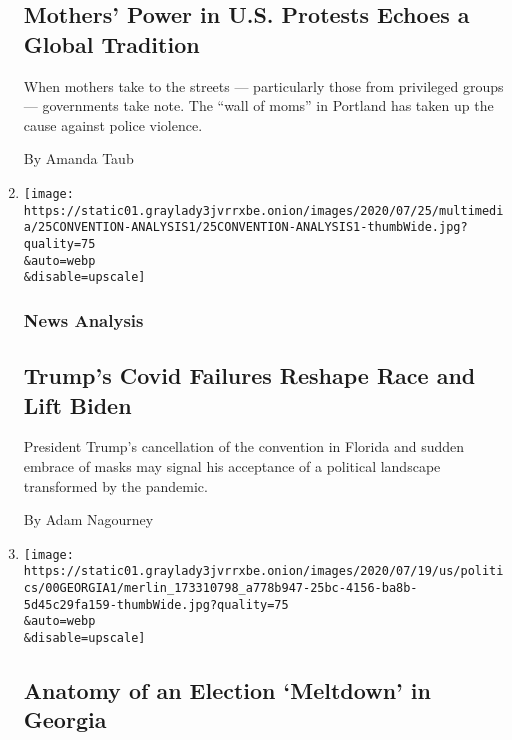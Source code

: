 \begin{enumerate}
  \hypertarget{mothers-power-in-us-protests-echoes-a-global-tradition}{%
  \subsection{Mothers' Power in U.S. Protests Echoes a Global
  Tradition}\label{mothers-power-in-us-protests-echoes-a-global-tradition}}

  When mothers take to the streets --- particularly those from
  privileged groups --- governments take note. The ``wall of moms'' in
  Portland has taken up the cause against police violence.

  By Amanda Taub
\item
  \href{/2020/07/25/us/politics/trump-florida-convention.html}{}

  \texttt{[image: https://static01.graylady3jvrrxbe.onion/images/2020/07/25/multimedia/25CONVENTION-ANALYSIS1/25CONVENTION-ANALYSIS1-thumbWide.jpg?quality=75\\\&auto=webp\\\&disable=upscale]}

  \hypertarget{news-analysis-1}{%
  \subsubsection{News Analysis}\label{news-analysis-1}}

  \hypertarget{trumps-covid-failures-reshape-race-and-lift-biden-1}{%
  \subsection{Trump's Covid Failures Reshape Race and Lift
  Biden}\label{trumps-covid-failures-reshape-race-and-lift-biden-1}}

  President Trump's cancellation of the convention in Florida and sudden
  embrace of masks may signal his acceptance of a political landscape
  transformed by the pandemic.

  By Adam Nagourney
\item
  \href{/2020/07/25/us/politics/georgia-election-voting-problems.html}{}

  \texttt{[image: https://static01.graylady3jvrrxbe.onion/images/2020/07/19/us/politics/00GEORGIA1/merlin\_173310798\_a778b947-25bc-4156-ba8b-5d45c29fa159-thumbWide.jpg?quality=75\\\&auto=webp\\\&disable=upscale]}

  \hypertarget{anatomy-of-an-election-meltdown-in-georgia-1}{%
  \subsection{Anatomy of an Election `Meltdown' in
  Georgia}\label{anatomy-of-an-election-meltdown-in-georgia-1}}


\end{enumerate}
